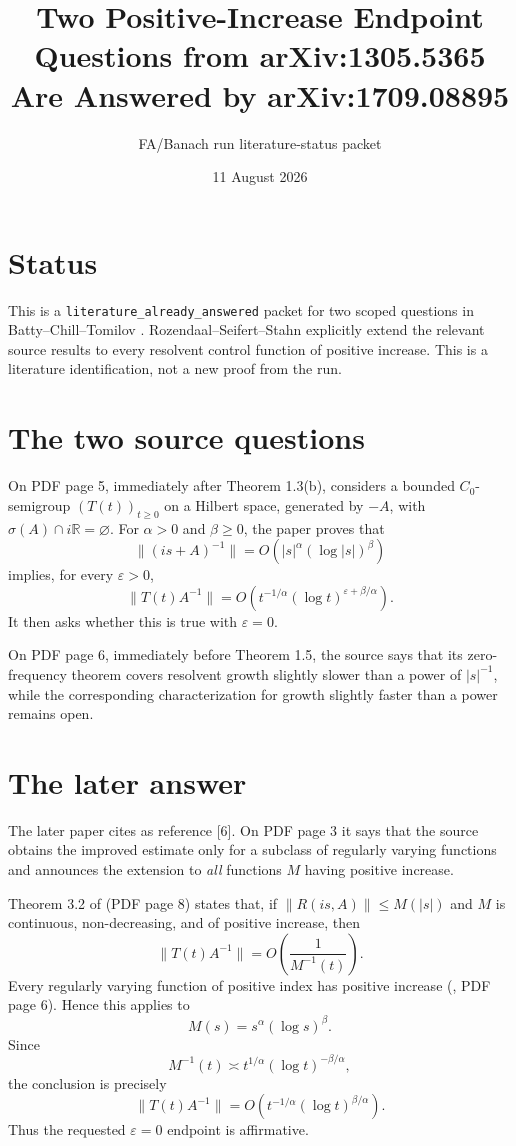 \documentclass[11pt]{article}
\title{Two Positive-Increase Endpoint Questions from arXiv:1305.5365\\
Are Answered by arXiv:1709.08895}
\author{FA/Banach run literature-status packet}
\date{11 August 2026}
\begin{document}
\maketitle

\section*{Status}

This is a \texttt{literature\_already\_answered} packet for two scoped
questions in Batty--Chill--Tomilov \cite{BCT}.  Rozendaal--Seifert--Stahn
\cite{RSS} explicitly extend the relevant source results to every resolvent
control function of positive increase.  This is a literature identification,
not a new proof from the run.

\section*{The two source questions}

On PDF page 5, immediately after Theorem 1.3(b), \cite{BCT} considers a
bounded $C_0$-semigroup $(T(t))_{t\ge0}$ on a Hilbert space, generated by
$-A$, with $\sigma(A)\cap i\mathbb R=\varnothing$.  For $\alpha>0$ and
$\beta\ge0$, the paper proves that
\[
 \|(is+A)^{-1}\|=O\!\left(|s|^\alpha(\log|s|)^\beta\right)
\]
implies, for every $\varepsilon>0$,
\[
 \|T(t)A^{-1}\|=
 O\!\left(t^{-1/\alpha}(\log t)^{\varepsilon+\beta/\alpha}\right).
\]
It then asks whether this is true with $\varepsilon=0$.

On PDF page 6, immediately before Theorem 1.5, the source says that its
zero-frequency theorem covers resolvent growth slightly slower than a power
of $|s|^{-1}$, while the corresponding characterization for growth slightly
faster than a power remains open.

\section*{The later answer}

The later paper \cite{RSS} cites \cite{BCT} as reference [6].  On PDF page 3
it says that the source obtains the improved estimate only for a subclass of
regularly varying functions and announces the extension to \emph{all}
functions $M$ having positive increase.

Theorem 3.2 of \cite{RSS} (PDF page 8) states that, if
$\|R(is,A)\|\le M(|s|)$ and $M$ is continuous, non-decreasing, and of
positive increase, then
\[
 \|T(t)A^{-1}\|=O\!\left(\frac{1}{M^{-1}(t)}\right).
\]
Every regularly varying function of positive index has positive increase
(\cite{RSS}, PDF page 6).  Hence this applies to
\[
 M(s)=s^\alpha(\log s)^\beta.
\]
Since
\[
 M^{-1}(t)\asymp
 t^{1/\alpha}(\log t)^{-\beta/\alpha},
\]
the conclusion is precisely
\[
 \|T(t)A^{-1}\|=
 O\!\left(t^{-1/\alpha}(\log t)^{\beta/\alpha}\right).
\]
Thus the requested $\varepsilon=0$ endpoint is affirmative.
\end{document}
